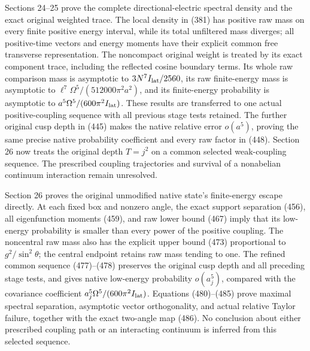 \documentclass[
  11pt,
]{article}
\begin{document}
Sections 24--25 prove the complete directional-electric spectral density
and the exact original weighted trace. The local density in (381) has
positive raw mass on every finite positive energy interval, while its
total unfiltered mass diverges; all positive-time vectors and energy
moments have their explicit common free transverse representation. The
noncompact original weight is treated by its exact component trace,
including the reflected cosine boundary terms. Its whole raw comparison
mass is asymptotic to \(3N^7I_{\rm lat}/2560\), its raw finite-energy
mass is asymptotic to \(\ell^7\Omega^5/(512000\pi^2a^2)\), and its
finite-energy probability is asymptotic to
\(a^5\Omega^5/(600\pi^2I_{\rm lat})\). These results are transferred to
one actual positive-coupling sequence with all previous stage tests
retained. The further original cusp depth in (445) makes the native
relative error \(o(a^5)\), proving the same precise native probability
coefficient and every raw factor in (448). Section 26 now treats the
original depth \(T=j^2\) on a common selected weak-coupling sequence.
The prescribed coupling trajectories and survival of a nonabelian
continuum interaction remain unresolved.

Section 26 proves the original unmodified native state's finite-energy
escape directly. At each fixed box and nonzero angle, the exact support
separation (456), all eigenfunction moments (459), and raw lower bound
(467) imply that its low-energy probability is smaller than every power
of the positive coupling. The noncentral raw mass also has the explicit
upper bound (473) proportional to \(g^2/\sin^2\theta\); the central
endpoint retains raw mass tending to one. The refined common sequence
(477)--(478) preserves the original cusp depth and all preceding stage
tests, and gives native low-energy probability \(o(a_j^5)\), compared
with the covariance coefficient \(a_j^5\Omega^5/(600\pi^2I_{\rm lat})\).
Equations (480)--(485) prove maximal spectral separation, asymptotic
vector orthogonality, and actual relative Taylor failure, together with
the exact two-angle map (486). No conclusion about either prescribed
coupling path or an interacting continuum is inferred from this selected
sequence.
\end{document}
